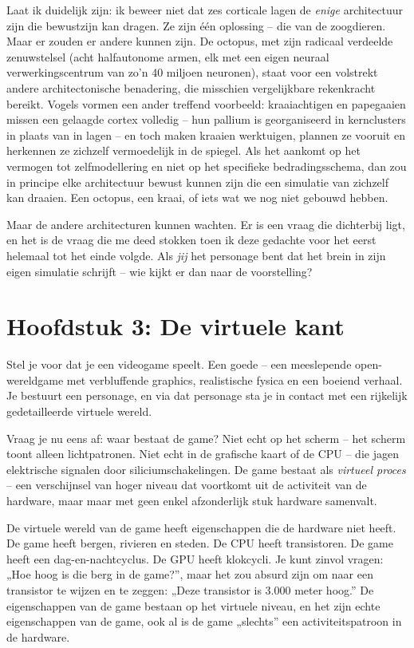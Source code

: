 \documentclass[11pt, twoside, openright]{book}
\begin{document}
Laat ik duidelijk zijn: ik beweer niet dat zes corticale lagen de \textit{enige} architectuur zijn die bewustzijn kan dragen. Ze zijn één oplossing -- die van de zoogdieren. Maar er zouden er andere kunnen zijn. De octopus, met zijn radicaal verdeelde zenuwstelsel (acht halfautonome armen, elk met een eigen neuraal verwerkingscentrum van zo'n 40 miljoen neuronen), staat voor een volstrekt andere architectonische benadering, die misschien vergelijkbare rekenkracht bereikt. Vogels vormen een ander treffend voorbeeld: kraaiachtigen en papegaaien missen een gelaagde cortex volledig -- hun pallium is georganiseerd in kernclusters in plaats van in lagen -- en toch maken kraaien werktuigen, plannen ze vooruit en herkennen ze zichzelf vermoedelijk in de spiegel. Als het aankomt op het vermogen tot zelfmodellering en niet op het specifieke bedradingsschema, dan zou in principe elke architectuur bewust kunnen zijn die een simulatie van zichzelf kan draaien. Een octopus, een kraai, of iets wat we nog niet gebouwd hebben.

Maar de andere architecturen kunnen wachten. Er is een vraag die dichterbij ligt, en het is de vraag die me deed stokken toen ik deze gedachte voor het eerst helemaal tot het einde volgde. Als \textit{jij} het personage bent dat het brein in zijn eigen simulatie schrijft -- wie kijkt er dan naar de voorstelling?


\chapter*{Hoofdstuk 3: De virtuele kant}

Stel je voor dat je een videogame speelt. Een goede -- een meeslepende open-wereldgame met verbluffende graphics, realistische fysica en een boeiend verhaal. Je bestuurt een personage, en via dat personage sta je in contact met een rijkelijk gedetailleerde virtuele wereld.

Vraag je nu eens af: waar bestaat de game? Niet echt op het scherm -- het scherm toont alleen lichtpatronen. Niet echt in de grafische kaart of de CPU -- die jagen elektrische signalen door siliciumschakelingen. De game bestaat als \textit{virtueel proces} -- een verschijnsel van hoger niveau dat voortkomt uit de activiteit van de hardware, maar maar met geen enkel afzonderlijk stuk hardware samenvalt.

De virtuele wereld van de game heeft eigenschappen die de hardware niet heeft. De game heeft bergen, rivieren en steden. De CPU heeft transistoren. De game heeft een dag-en-nachtcyclus. De GPU heeft klokcycli. Je kunt zinvol vragen: „Hoe hoog is die berg in de game?”, maar het zou absurd zijn om naar een transistor te wijzen en te zeggen: „Deze transistor is 3.000 meter hoog.” De eigenschappen van de game bestaan op het virtuele niveau, en het zijn echte eigenschappen van de game, ook al is de game „slechts” een activiteitspatroon in de hardware.
\end{document}
